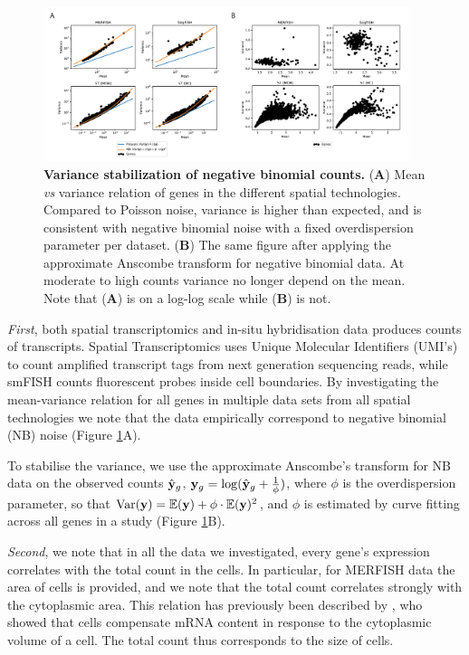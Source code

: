 \begin{figure}
    \centering
    \includegraphics[width=0.95\textwidth]{"anscombe-figure"}
    \caption[Variance stabilization of negative binomial counts]{\textbf{Variance stabilization of negative binomial counts.} (\textbf{A}) Mean \textit{vs} variance relation of genes in the different spatial technologies. Compared to Poisson noise, variance is higher than expected, and is consistent with negative binomial noise with a fixed overdispersion parameter per dataset. (\textbf{B}) The same figure after applying the approximate Anscombe transform for negative binomial data. At moderate to high counts variance no longer depend on the mean. Note that (\textbf{A}) is on a log-log scale while (\textbf{B}) is not.}
    \label{fig:anscombe}
\end{figure}

\textit{First}, both spatial transcriptomics and in-situ hybridisation data produces counts of transcripts. Spatial Transcriptomics uses Unique Molecular Identifiers (UMI's) to count amplified transcript tags from next generation sequencing reads, while smFISH counts fluorescent probes inside cell boundaries. By investigating the mean-variance relation for all genes in multiple data sets from all spatial technologies we note that the data empirically correspond to negative binomial (NB) noise (Figure \ref{fig:anscombe}A).

To stabilise the variance, we use the approximate Anscombe's transform for NB data on the observed counts \( \hat{{\bf y}}_g \), \( {\bf y}_g = \log(\hat{{\bf y}}_g + \frac{1}{\phi}) \), where \( \phi \) is the overdispersion parameter, so that \( \text{Var}({\bf y}) = \mathbb{E}({\bf y}) + \phi \cdot \mathbb{E}({\bf y})^2 \), and \( \phi \) is estimated by curve fitting across all genes in a study \cite{Anscombe1948-uw} (Figure \ref{fig:anscombe}B).

\textit{Second}, we note that in all the data we investigated, every gene's expression correlates with the total count in the cells. In particular, for MERFISH data the area of cells is provided, and we note that the total count correlates strongly with the cytoplasmic area.  This relation has previously been described by \citet{Padovan-Merhar2015-ne}, who showed that cells compensate mRNA content in response to the cytoplasmic volume of a cell. The total count thus corresponds to the size of cells.

